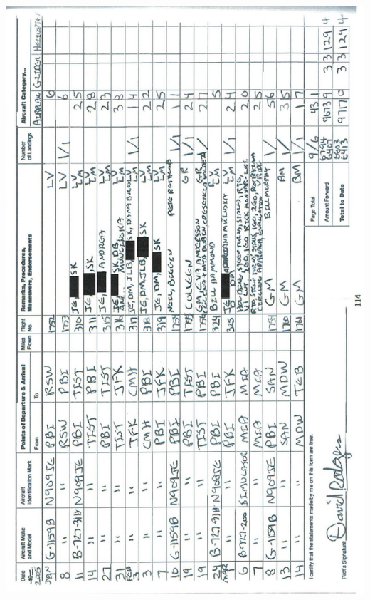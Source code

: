\documentclass[10pt]{article}
\begin{document}
\includegraphics[max width=\textwidth, center]{2025_02_27_dd68c3d38de88f0516d9g-118}\\
\end{document}
